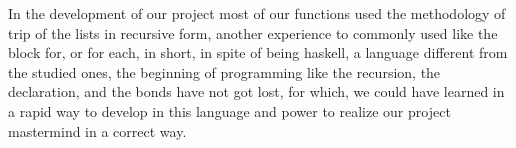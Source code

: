 \documentclass[12pt,letterpaper]{article}
\begin{document}
\begin{itemize}
\begin{raggedleft}
In the development of our project most of our functions used the methodology of trip of the lists in recursive form, another experience to commonly used like the block for, or for each, in short, in spite of being haskell, a language different from the studied ones, the beginning of programming like the recursion, the declaration, and the bonds have not got lost, for which, we could have learned in a rapid way to develop in this language and power to realize our project mastermind in a correct way.
\end{raggedleft}

 \end{itemize}
\end{document}
